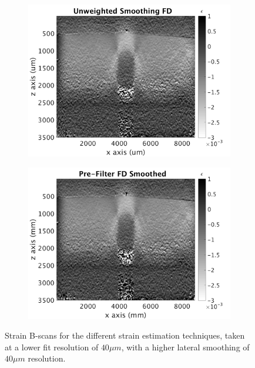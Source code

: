 \begin{figure}[h]
\begin{subfigure}{0.49\textwidth}
        \includegraphics[width=\textwidth]{appendix_figs/uwfd_fr40_lr40.png}
    \end{subfigure}
    \begin{subfigure}{0.49\textwidth}
    	\centering
        \includegraphics[width=\textwidth]{appendix_figs/fdsm_fr40_lr40.png}
    \end{subfigure}    
    \caption{Strain B-scans for the different strain estimation techniques, taken at a lower fit resolution of $40\mu m$, with a higher lateral smoothing of $40 \mu m$ resolution.}
	\label{fr40_lr40}
\end{figure}

